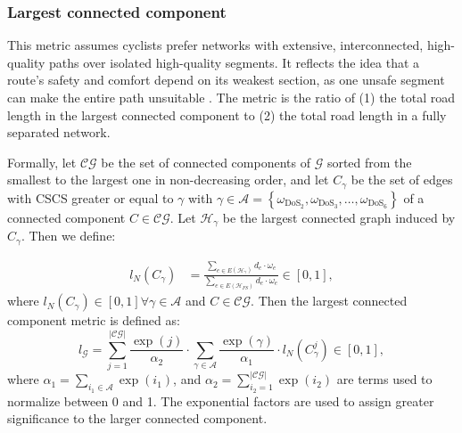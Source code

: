 \documentclass[lettersize,journal]{IEEEtran}
\begin{document}
\subsubsection{Largest connected component}
\label{connected_component}
This metric assumes cyclists prefer networks with extensive, interconnected, high-quality paths over isolated high-quality segments. It reflects the idea that a route's safety and comfort depend on its weakest section, as one unsafe segment can make the entire path unsuitable \cite{mekuria2012low}. The metric is the ratio of (1) the total road length in the largest connected component to (2) the total road length in a fully separated network.

Formally, let $\mathcal{CG}$ be the set of connected components of $\mathcal{G}$ sorted from the smallest to the largest one in non-decreasing order, and let $C_{\gamma}$ be the set of edges with CSCS greater or equal to $\gamma$ with $\gamma \in \mathcal{A}  = \left \{\omega_{\text{DoS}_2}, \omega_{\text{DoS}_3}, \ldots, \omega_{\text{DoS}_6} \right \}  $ of a connected component $C \in \mathcal{CG}$. Let $\mathcal{H}_{\gamma}$ be the largest connected graph induced by $C_{\gamma}$. Then we define: 

\begin{align} \nonumber
     l_N(C_{\gamma}) & = \frac{ \sum_{e \in E(\mathcal{H_{\gamma}})} d_{e} \cdot\omega_{e}  }{ \sum_{e \in E(\mathcal{H}_{FS})} d_{e} \cdot\omega_{e} } \in \left [ 0,1 \right],
\end{align}
where $l_N(C_{\gamma}) \in \left [ 0,1 \right] \forall \gamma \in \mathcal{A}$ and $C \in \mathcal{CG}$. Then the largest connected component metric is defined as:
\begin{equation} \nonumber
    l_{\mathcal{G}} = \sum_{j=1}^{|\mathcal{CG}|} \frac{\exp{(j)}}{\alpha_{2}} \cdot  \sum_{\gamma \in \mathcal{A}} \frac{\exp{(\gamma)}}{\alpha_{1}} \cdot l_N(C_{\gamma}^{j})   \in \left [ 0,1 \right],
\end{equation}
where $\alpha_{1} = \sum_{i_{1} \in \mathcal{A}} \exp{(i_{1})}$, and $\alpha_{2} = \sum_{i_{2}=1}^{|\mathcal{CG}|} \exp{(i_{2})}$ are terms used to normalize between 0 and 1. The exponential factors are used to assign greater significance to the larger connected component.
\end{document}

